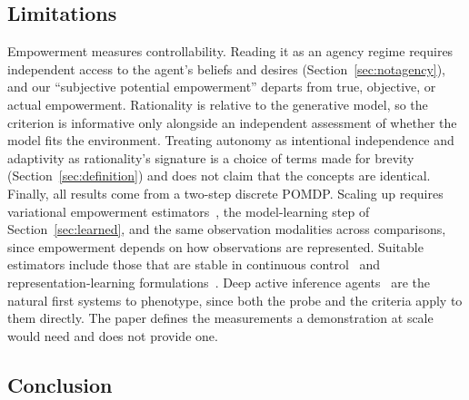 \documentclass[letterpaper]{article} %
\theoremstyle{definition}
\begin{document}
\subsection{Limitations}
Empowerment measures controllability. Reading it as an agency regime requires independent access to the agent's beliefs and desires (Section~\ref{sec:notagency}), and our ``subjective potential empowerment'' departs from true, objective, or actual empowerment. Rationality is relative to the generative model, so the criterion is informative only alongside an independent assessment of whether the model fits the environment. Treating autonomy as intentional independence and adaptivity as rationality's signature is a choice of terms made for brevity (Section~\ref{sec:definition}) and does not claim that the concepts are identical. Finally, all results come from a two-step discrete POMDP. Scaling up requires variational empowerment estimators~\citep{mohamedVariationalInformationMaximisation2015}, the model-learning step of Section~\ref{sec:learned}, and the same observation modalities across comparisons, since empowerment depends on how observations are represented. Suitable estimators include those that are stable in continuous control~\citep{zhaoEfficientEmpowerment2021} and representation-learning formulations~\citep{choiVariationalEmpowerment2021}. Deep active inference agents~\citep{fountasDeepActiveInference2020} are the natural first systems to phenotype, since both the probe and the criteria apply to them directly. The paper defines the measurements a demonstration at scale would need and does not provide one.

\subsection{Conclusion}
\end{document}
